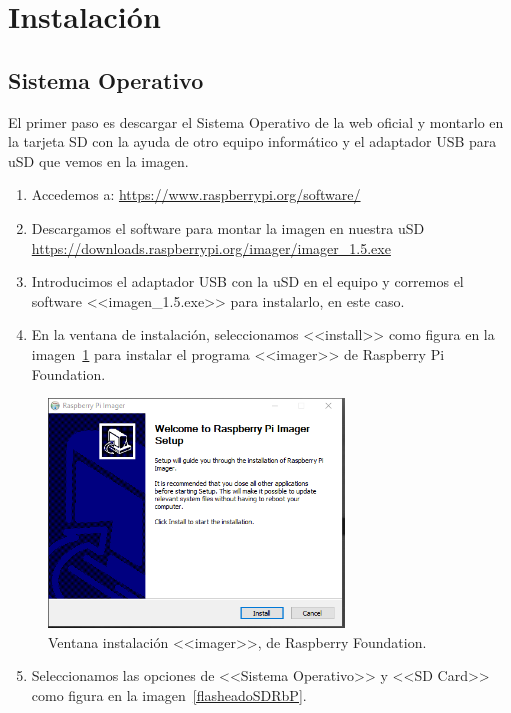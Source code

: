 \section{Instalación}

\subsection{Sistema Operativo}
El primer paso es descargar el Sistema Operativo de la web oficial y montarlo en la tarjeta SD con la ayuda de otro equipo informático y el adaptador USB para uSD que vemos en la imagen\label{material}. 

\begin{enumerate}
    \item Accedemos a: \url{https://www.raspberrypi.org/software/}
    \item Descargamos el software para montar la imagen en nuestra uSD \url{https://downloads.raspberrypi.org/imager/imager_1.5.exe}
    \item Introducimos el adaptador USB con la uSD en el equipo y corremos el software <<imagen\_1.5.exe>> para instalarlo, en este caso.
    \item En la ventana de instalación, seleccionamos <<install>> como figura en la imagen~\ref{instalacionRaspbian} para instalar el programa <<imager>> de Raspberry Pi Foundation.
\end{enumerate}

\begin{figure}[h]
\centering
\includegraphics[width=0.7\textwidth]{img/fotos/instalacionRaspbian.PNG}
\caption{Ventana instalación <<imager>>, de Raspberry Foundation.}\label{instalacionRaspbian}
\end{figure}

\begin{enumerate}
\setcounter{enumi}{4}
    \item Seleccionamos las opciones de <<Sistema Operativo>> y <<SD Card>> como figura en la imagen~\ref{flasheadoSDRbP}.
\end{enumerate}


